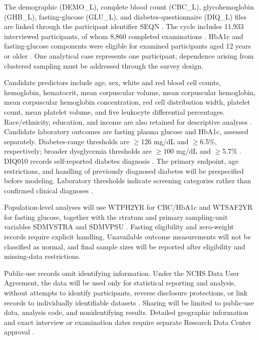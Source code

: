 \documentclass[conference]{IEEEtran}
\begin{document}
The demographic (DEMO\_L), complete blood count (CBC\_L), glycohemoglobin (GHB\_L), fasting-glucose (GLU\_L), and diabetes-questionnaire (DIQ\_L) files are linked through the participant identifier SEQN \cite{demo_l,cbc_l,ghb_l,glu_l,diq_l}. The cycle includes 11,933 interviewed participants, of whom 8,860 completed examinations \cite{terry2024}. HbA1c and fasting-glucose components were eligible for examined participants aged 12 years or older \cite{ghb_l,glu_l}. One analytical case represents one participant; dependence arising from clustered sampling must be addressed through the survey design.


Candidate predictors include age, sex, white and red blood cell counts, hemoglobin, hematocrit, mean corpuscular volume, mean corpuscular hemoglobin, mean corpuscular hemoglobin concentration, red cell distribution width, platelet count, mean platelet volume, and five leukocyte differential percentages. Race/ethnicity, education, and income are also retained for descriptive analyses \cite{demo_l,cbc_l}. Candidate laboratory outcomes are fasting plasma glucose and HbA1c, assessed separately. Diabetes-range thresholds are \(\geq\)126 mg/dL and \(\geq\)6.5\%, respectively; broader dysglycemia thresholds are \(\geq\)100 mg/dL and \(\geq\)5.7\% \cite{ada_diagnosis}. DIQ010 records self-reported diabetes diagnosis \cite{diq_l}. The primary endpoint, age restrictions, and handling of previously diagnosed diabetes will be prespecified before modeling. Laboratory thresholds indicate screening categories rather than confirmed clinical diagnoses \cite{ada_diagnosis}.


Population-level analyses will use WTPH2YR for CBC/HbA1c and WTSAF2YR for fasting glucose, together with the stratum and primary sampling-unit variables SDMVSTRA and SDMVPSU \cite{nhanes_overview,cbc_l,ghb_l,glu_l}. Fasting eligibility and zero-weight records require explicit handling. Unavailable outcome measurements will not be classified as normal, and final sample sizes will be reported after eligibility and missing-data restrictions.


Public-use records omit identifying information. Under the NCHS Data User Agreement, the data will be used only for statistical reporting and analysis, without attempts to identify participants, reverse disclosure protections, or link records to individually identifiable datasets \cite{nchs_dua}. Sharing will be limited to public-use data, analysis code, and nonidentifying results. Detailed geographic information and exact interview or examination dates require separate Research Data Center approval \cite{rdc_nhanes}.
\end{document}
